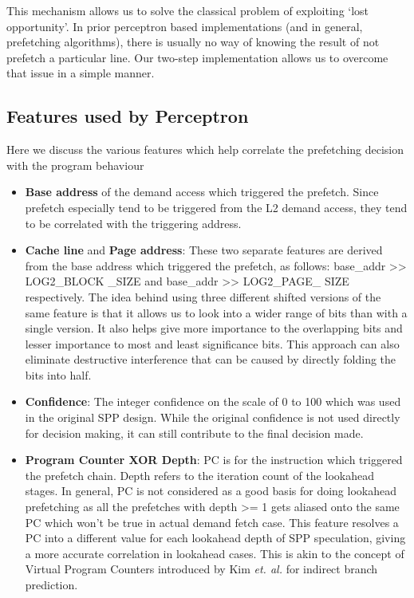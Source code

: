 \documentclass{sig-alternate}
\begin{document}
This mechanism allows us to solve the classical problem of exploiting `lost opportunity'. 
In prior perceptron based implementations (and in general, prefetching algorithms), there is usually no way of knowing the result of not prefetch a particular line.
Our two-step implementation allows us to overcome that issue in a simple manner.

\subsection{Features used by Perceptron}

Here we discuss the various features which help correlate the prefetching decision with the program behaviour
\begin{itemize}
\item \textbf{Base address} of the demand access which triggered the prefetch. 
Since prefetch especially tend to be triggered from the L2 demand access, they tend to be correlated with the triggering address.

\item \textbf{Cache line} and \textbf{Page address}: These two separate features are derived from the base address which triggered the prefetch, as follows: base\_addr >> LOG2\_BLOCK \_SIZE and base\_addr >> LOG2\_PAGE\_ SIZE respectively.
The idea behind using three different shifted versions of the same feature is that it allows us to look into a wider range of bits than with a single version.
It also helps give more importance to the overlapping bits and lesser importance to most and least significance bits.
This approach can also eliminate destructive interference that can be caused by directly folding the bits into half.

\item \textbf{Confidence}: The integer confidence on the scale of 0 to 100 which was used in the original SPP design.
While the original confidence is not used directly for decision making, it can still contribute to the final decision made.

\item \textbf{Program Counter XOR Depth}: PC is for the instruction which triggered the prefetch chain.
Depth refers to the iteration count of the lookahead stages.
In general, PC is not considered as a good basis for doing lookahead prefetching as all the prefetches with depth >= 1 gets aliased onto the same PC which won't be true in actual demand fetch case.
This feature resolves a PC into a different value for each lookahead depth of SPP speculation, giving a more accurate correlation in lookahead cases.
This is akin to the concept of Virtual Program Counters\cite{VPC} introduced by Kim \textit{et. al.} for indirect branch prediction.



\end{itemize}
\end{document}
